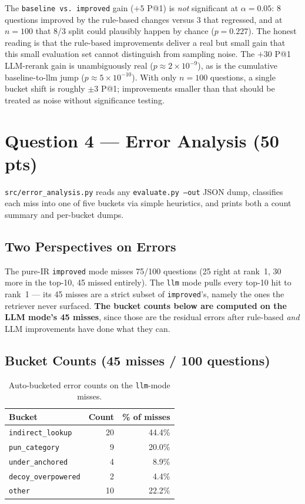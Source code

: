 \documentclass[11pt]{article}
\begin{document}
The \texttt{baseline vs.\ improved} gain ($+5$ P@1) is \emph{not}
significant at $\alpha = 0.05$: 8 questions improved by the rule-based
changes versus 3 that regressed, and at $n = 100$ that 8/3 split could
plausibly happen by chance ($p = 0.227$). The honest reading is that
the rule-based improvements deliver a real but small gain that this
small evaluation set cannot distinguish from sampling noise. The
$+30$ P@1 LLM-rerank gain is unambiguously real
($p \approx 2 \times 10^{-9}$), as is the cumulative
baseline-to-llm jump ($p \approx 5 \times 10^{-10}$). With only $n = 100$
questions, a single bucket shift is roughly $\pm 3$ P@1; improvements
smaller than that should be treated as noise without significance
testing.

\section{Question 4 --- Error Analysis (50 pts)}
\label{sec:error}

\texttt{src/error\_analysis.py} reads any \texttt{evaluate.py --out} JSON
dump, classifies each miss into one of five buckets via simple
heuristics, and prints both a count summary and per-bucket dumps.

\subsection{Two Perspectives on Errors}

The pure-IR \texttt{improved} mode misses 75/100 questions (25 right at
rank~1, 30 more in the top-10, 45 missed entirely). The \texttt{llm}
mode pulls every top-10 hit to rank~1 --- its 45 misses are a strict
subset of \texttt{improved}'s, namely the ones the retriever never
surfaced. \textbf{The bucket counts below are computed on the LLM mode's 45
misses}, since those are the residual errors after rule-based
\emph{and} LLM improvements have done what they can.

\subsection{Bucket Counts (45 misses / 100 questions)}

\begin{table}[h]
\centering
\begin{tabular}{lrr}
\toprule
\textbf{Bucket} & \textbf{Count} & \textbf{\% of misses} \\
\midrule
\texttt{indirect\_lookup}   & 20 & 44.4\% \\
\texttt{pun\_category}      &  9 & 20.0\% \\
\texttt{under\_anchored}    &  4 &  8.9\% \\
\texttt{decoy\_overpowered} &  2 &  4.4\% \\
\texttt{other}              & 10 & 22.2\% \\
\bottomrule
\end{tabular}
\caption{Auto-bucketed error counts on the \texttt{llm}-mode misses.}
\end{table}
\end{document}
